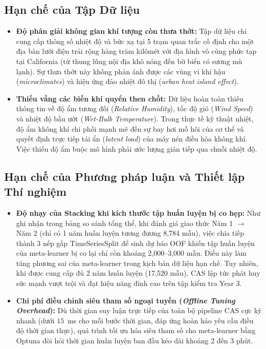 \subsection{Hạn chế của Tập Dữ liệu}
\begin{itemize}
    \item \textbf{Độ phân giải không gian khí tượng còn thưa thớt:} Tập dữ liệu chỉ cung cấp thông số nhiệt độ và bức xạ tại 5 trạm quan trắc cố định cho một địa bàn lưới điện trải rộng hàng trăm kilômét với địa hình vô cùng phức tạp tại California (từ thung lũng nội địa khô nóng đến bờ biển có sương mù lạnh). Sự thưa thớt này không phản ánh được các vùng vi khí hậu (\textit{microclimates}) và hiệu ứng đảo nhiệt đô thị (\textit{urban heat island effect}).
    \item \textbf{Thiếu vắng các biến khí quyển then chốt:} Dữ liệu hoàn toàn thiếu thông tin về độ ẩm tương đối (\textit{Relative Humidity}), tốc độ gió (\textit{Wind Speed}) và nhiệt độ bầu ướt (\textit{Wet-Bulb Temperature}). Trong thực tế kỹ thuật nhiệt, độ ẩm không khí chi phối mạnh mẽ đến sự bay hơi mồ hôi của cơ thể và quyết định trực tiếp tải ẩn (\textit{latent load}) của máy nén điều hòa không khí. Việc thiếu độ ẩm buộc mô hình phải ước lượng gián tiếp qua chuỗi nhiệt độ.
\end{itemize}

\subsection{Hạn chế của Phương pháp luận và Thiết lập Thí nghiệm}
\begin{itemize}
    \item \textbf{Độ nhạy của Stacking khi kích thước tập huấn luyện bị co hẹp:} Như ghi nhận trong bảng so sánh tổng thể, khi đánh giá giao thức Năm 1 $\to$ Năm 2 (chỉ có 1 năm huấn luyện tương đương 8,784 mẫu), việc chia tiếp thành 3 nếp gấp TimeSeriesSplit để sinh dự báo OOF khiến tập huấn luyện của meta-learner bị co lại chỉ còn khoảng 2,000--3,000 mẫu. Điều này làm tăng phương sai của meta-learner trong kịch bản dữ liệu hạn chế. Tuy nhiên, khi được cung cấp đủ 2 năm huấn luyện (17,520 mẫu), CAS lập tức phát huy sức mạnh vượt trội và đạt hiệu năng đỉnh cao trên tập kiểm tra Year 3.
    \item \textbf{Chi phí điều chỉnh siêu tham số ngoại tuyến (\textit{Offline Tuning Overhead}):} Dù thời gian suy luận trực tiếp của toàn bộ pipeline CAS cực kỳ nhanh (dưới $15$~ms cho mỗi bước thời gian, đáp ứng hoàn hảo yêu cầu điều độ thời gian thực), quá trình tối ưu hóa siêu tham số cho meta-learner bằng Optuna đòi hỏi thời gian huấn luyện ban đầu kéo dài khoảng 2 đến 3 phút.
\end{itemize}
